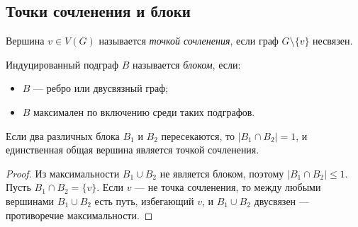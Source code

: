 \subsection{Точки сочленения и блоки}

\begin{Definition}{}{}
  Вершина $v \in V(G)$ называется \emph{точкой сочленения},
  если граф $G \setminus \{v\}$ несвязен.
\end{Definition}

\begin{Definition}{}{}
  Индуцированный подграф $B$ называется \emph{блоком}, если:
  \begin{itemize}
    \item $B$ — ребро или двусвязный граф;
    \item $B$ максимален по включению среди таких подграфов.
  \end{itemize}
\end{Definition}

\begin{Statement}{}{}
  Если два различных блока $B_1$ и $B_2$ пересекаются,
  то $|B_1 \cap B_2| = 1$, и единственная общая вершина
  является точкой сочленения.
\end{Statement}

\begin{proof}
  Из максимальности $B_1 \cup B_2$ не является блоком,
  поэтому $|B_1 \cap B_2| \le 1$.
  Пусть $B_1 \cap B_2 = \{v\}$.
  Если $v$ — не точка сочленения, то между любыми вершинами
  $B_1 \cup B_2$ есть путь, избегающий $v$, и $B_1 \cup B_2$
  двусвязен — противоречие максимальности.
\end{proof}

